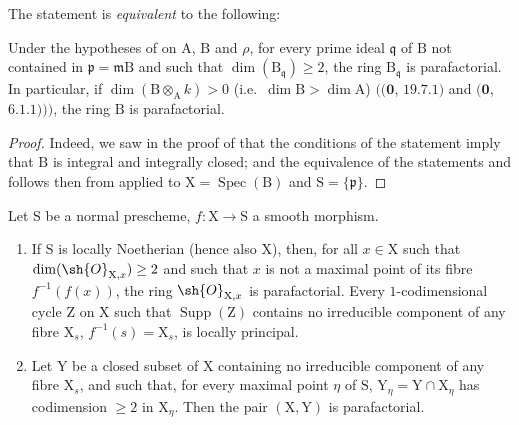 The statement  is \emph{equivalent} to the following:

\begin{corollary}[21.14.2]
\label{IV.21.14.2}
Under the hypotheses of  on $\mathrm{A}$, $\mathrm{B}$ and $\rho$, for every prime ideal $\mathfrak{q}$ of $\mathrm{B}$ not contained in $\mathfrak{p}=\mathfrak{m}\mathrm{B}$ and such that $\dim(\mathrm{B}_{\mathfrak{q}})\geq 2$, the ring $\mathrm{B}_{\mathfrak{q}}$ is parafactorial.
In particular, if $\dim(\mathrm{B}\otimes_{\mathrm{A}}k)>0$ (i.e.\ $\dim\mathrm{B}>\dim\mathrm{A}$) $((\mathbf{0}$, $19.7.1)$ and $(\mathbf{0}$, $6.1.1)))$, the ring $\mathrm{B}$ is parafactorial.
\end{corollary}

\begin{proof}
Indeed, we saw in the proof of  that the conditions of the statement imply that $\mathrm{B}$ is integral and integrally closed; and the equivalence of the statements  and  follows then from  applied to $\mathrm{X}=\operatorname{Spec}(\mathrm{B})$ and $\mathrm{S}=\{\mathfrak{p}\}$.
\end{proof}

\begin{proposition}[21.14.3]
\label{IV.21.14.3}
Let $\mathrm{S}$ be a normal prescheme, $f:\mathrm{X}\to\mathrm{S}$ a smooth morphism.
\begin{enumerate}[label=(\roman*)]
  \item If $\mathrm{S}$ is locally Noetherian (hence also $\mathrm{X}$), then, for all $x\in\mathrm{X}$ such that $\dim(\sh{O}_{\mathrm{X},x})\geq 2$ and such that $x$ is not a maximal point of its fibre $f^{-1}(f(x))$, the ring $\sh{O}_{\mathrm{X},x}$ is parafactorial.
  Every $1$-codimensional cycle $\mathrm{Z}$ on $\mathrm{X}$ such that $\operatorname{Supp}(\mathrm{Z})$ contains no irreducible component of any fibre $\mathrm{X}_s$, $f^{-1}(s)=\mathrm{X}_s$, is locally principal.
  \item Let $\mathrm{Y}$ be a closed subset of $\mathrm{X}$ containing no irreducible component of any fibre $\mathrm{X}_s$, and such that, for every maximal point $\eta$ of $\mathrm{S}$, $\mathrm{Y}_\eta=\mathrm{Y}\cap\mathrm{X}_\eta$ has codimension $\geq 2$ in $\mathrm{X}_\eta$.
  Then the pair $(\mathrm{X},\mathrm{Y})$ is parafactorial.
\end{enumerate}
\end{proposition}

